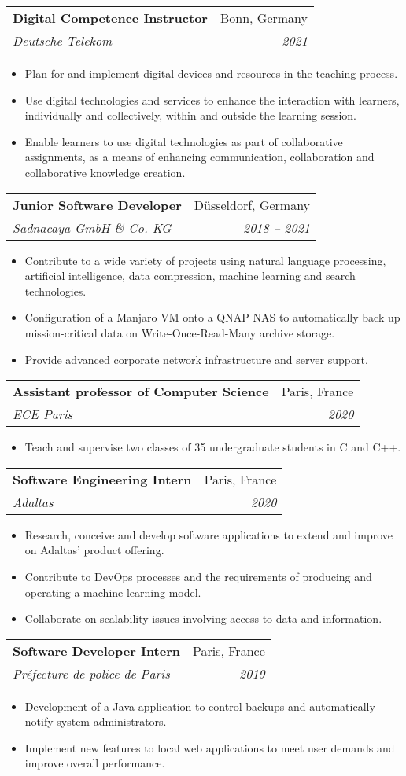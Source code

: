 \documentclass[a4paper,11pt]{article}
\makeatletter
\newcommand{\resumeItem}[2]{
  \item\small{
    \textbf{#1}{ #2 \vspace{-2pt}}
  }
}
\newcommand{\resumeSubheading}[4]{
  \vspace{-1pt}\item
    \begin{tabular*}{0.97\textwidth}{l@{\extracolsep{\fill}}r}
      \textbf{#1} & #2 \\
      \textit{\small#3} & \textit{\small #4} \\
    \end{tabular*}\vspace{-5pt}
}
\newcommand{\resumeItemListStart}{\begin{itemize}}
\newcommand{\resumeItemListEnd}{\end{itemize}\vspace{-5pt}}
\makeatother
\begin{document}
    \resumeSubheading
      {Digital Competence Instructor}{Bonn, Germany}
      {Deutsche Telekom}{2021}
      \resumeItemListStart
        \resumeItem{}
          {Plan for and implement digital devices and resources in the teaching process.}
        \resumeItem{}
          {Use digital technologies and services to enhance the interaction with learners, individually and collectively, within and outside the learning session.}
        \resumeItem{}
          {Enable learners to use digital technologies as part of collaborative assignments, as a means of enhancing communication, collaboration and collaborative knowledge creation.}
    \resumeItemListEnd
  
    \resumeSubheading
      {Junior Software Developer}{Düsseldorf, Germany}
      {Sadnacaya GmbH \& Co. KG}{2018 -- 2021}
      \resumeItemListStart
        \resumeItem{}
          {Contribute to a wide variety of projects using natural language processing, artificial intelligence, data compression, machine learning and search technologies.}
        \resumeItem{}
          {Configuration of a Manjaro VM onto a QNAP NAS to automatically back up mission-critical data on Write-Once-Read-Many archive storage.}
        \resumeItem{}
          {Provide advanced corporate network infrastructure and server support.}
      \resumeItemListEnd
      
    \resumeSubheading
      {Assistant professor of Computer Science}{Paris, France}
      {ECE Paris}{2020}
      \resumeItemListStart
        \resumeItem{}
          {Teach and supervise two classes of 35 undergraduate students in C and C++.}
    \resumeItemListEnd

    \resumeSubheading
      {Software Engineering Intern}{Paris, France}
      {Adaltas}{2020}
      \resumeItemListStart
        \resumeItem{}
          {Research, conceive and develop software applications to extend and improve on Adaltas' product offering.}
        \resumeItem{}
          {Contribute to DevOps processes and the requirements of producing and operating a machine learning model.}
        \resumeItem{}
          {Collaborate on scalability issues involving access to data and information.}
      \resumeItemListEnd
  
    \resumeSubheading
      {Software Developer Intern}{Paris, France}
      {Préfecture de police de Paris}{2019}
      \resumeItemListStart
        \resumeItem{}
          {Development of a Java application to control backups and automatically notify system administrators.}
        \resumeItem{}
          {Implement new features to local web applications to meet user demands and improve overall performance.}
      \resumeItemListEnd
\end{document}
